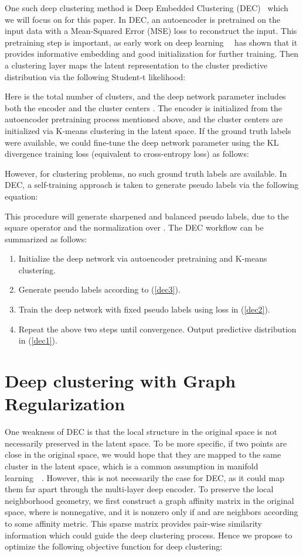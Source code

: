 \documentclass[letterpaper]{article}
\begin{document}
One such deep clustering method is Deep Embedded Clustering (DEC)~\cite{dec} which we will focus on for this paper. In DEC, an autoencoder is pretrained on the input data  with a Mean-Squared Error (MSE) loss to reconstruct the input. This pretraining step is important, as early work on deep learning~\cite{science}~\cite{contrastive} has shown that it provides informative embedding and good initialization for further training. Then a clustering layer maps the latent representation  to the cluster predictive distribution  via the following Student-t likelihood:

Here  is the total number of clusters, and the deep network parameter  includes both the encoder and the cluster centers . The encoder is initialized from the autoencoder pretraining process mentioned above, and the cluster centers are initialized via K-means clustering in the latent space. If the ground truth labels  were available, we could fine-tune the deep network parameter  using the KL divergence training loss (equivalent to cross-entropy loss) as follows:

However, for clustering problems, no such ground truth labels are available. In DEC, a self-training approach is taken to generate pseudo labels via the following equation:

This procedure will generate sharpened and balanced pseudo labels, due to the square operator and the normalization over . The DEC workflow can be summarized as follows:
\begin{enumerate}
     \item Initialize the deep network via autoencoder pretraining and K-means clustering.
     \item Generate pseudo labels according to (\ref{dec3}).
     \item Train the deep network with fixed pseudo labels using loss in (\ref{dec2}).
     \item Repeat the above two steps until convergence. Output predictive distribution in (\ref{dec1}).
\end{enumerate}

\section{Deep clustering with Graph Regularization}
One weakness of DEC is that the local structure in the original space is not necessarily preserved in the latent space. To be more specific, if two points are close in the original space, we would hope that they are mapped to the same cluster in the latent space, which is a common assumption in manifold learning~\cite{lle}~\cite{isomap}. However, this is not necessarily the case for DEC, as it could map them far apart through the multi-layer deep encoder. To preserve the local neighborhood geometry, we first construct a graph affinity matrix  in the original space, where  is nonnegative, and it is nonzero only if  and  are neighbors according to some affinity metric. This sparse matrix  provides pair-wise similarity information which could guide the deep clustering process. Hence we propose to optimize the following objective function for deep clustering:
\end{document}

